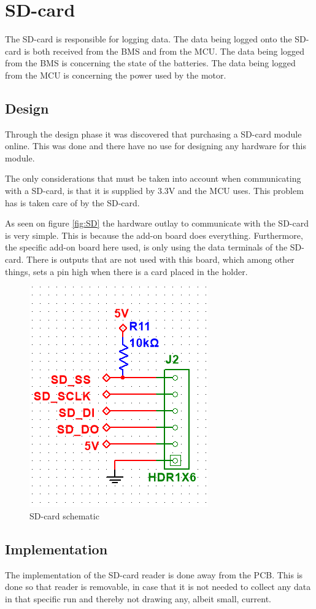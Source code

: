 \newpage
\section{SD-card}
The SD-card is responsible for logging data. The data being logged onto the SD-card is both received from the BMS and from the MCU. The data being logged from the BMS is concerning the state of the batteries. The data being logged from the MCU is concerning the power used by the motor.

\subsection{Design}
Through the design phase it was discovered that purchasing a SD-card module online. This was done and there have no use for designing any hardware for this module.

The only considerations that must be taken into account when communicating with a SD-card, is that it is supplied by 3.3V and the MCU uses. This problem has is taken care of by the SD-card.

As seen on figure \vref{fig:SD} the hardware outlay to communicate with the SD-card is very simple. This is because the add-on board does everything. Furthermore, the specific add-on board here used, is only using the data terminals of the SD-card. There is outputs that are not used with this board, which among other things, sets a pin high when there is a card placed in the holder. 

\begin{figure}[H]
	\centering
	\includegraphics[width=0.4\linewidth]{Hardware/Pictures/SD_card}
	\caption{SD-card schematic}
	\label{fig:SD}
\end{figure}

\newpage
\subsection{Implementation}
The implementation of the SD-card reader is done away from the PCB. This is done so that reader is removable, in case that it is not needed to collect any data in that specific run and thereby not drawing any, albeit small, current.  

